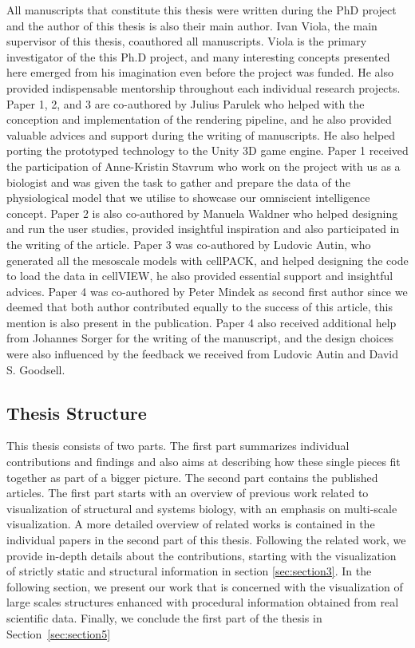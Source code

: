 All manuscripts that constitute this thesis were written during the PhD project and the author of this thesis is also their main author. 
Ivan Viola, the main supervisor of this thesis, coauthored all manuscripts. 
Viola is the primary investigator of the this Ph.D project, and many interesting concepts presented here emerged from his imagination even before the project was funded. 
He also provided indispensable mentorship throughout each individual research projects.
Paper 1, 2, and 3 are co-authored by Julius Parulek who helped with the conception and implementation of the rendering pipeline, and he also provided valuable advices and support during the writing of manuscripts.
He also helped porting the prototyped technology to the Unity 3D game engine. 
Paper 1 received the participation of Anne-Kristin Stavrum who work on the project with us as a biologist and was given the task to gather and prepare the data of the physiological model that we utilise to showcase our omniscient intelligence concept. 
Paper 2 is also co-authored by Manuela Waldner who helped designing and run the user studies, provided insightful inspiration and also participated in the writing of the article. 
Paper 3 was co-authored by Ludovic Autin, who generated all the mesoscale models with cellPACK, and helped designing the code to load the data in cellVIEW, he also provided essential support and insightful advices.
Paper 4 was co-authored by Peter Mindek as second first author since we deemed that both author contributed equally to the success of this article, this mention is also present in the publication.
Paper 4 also received additional help from Johannes Sorger for the writing of the manuscript, and the design choices were also influenced by the feedback we received from Ludovic Autin and David S. Goodsell.

\subsection{Thesis Structure}

This thesis consists of two parts.
The first part summarizes individual contributions and findings and also aims at describing how these single pieces fit together as part of a bigger picture.
The second part contains the published articles.
The first part starts with an overview of previous work related to visualization of structural and systems biology, with an emphasis on multi-scale visualization. 
A more detailed overview of related works is contained in the individual papers in the second part of this thesis. 
Following the related work, we provide in-depth details about the contributions, starting with the visualization of strictly static and structural information in section \ref{sec:section3}.
In the following section, we present our work that is concerned with the visualization of large scales structures enhanced with procedural information obtained from real scientific data. 
Finally, we conclude the first part of the thesis in Section~\ref{sec:section5}

